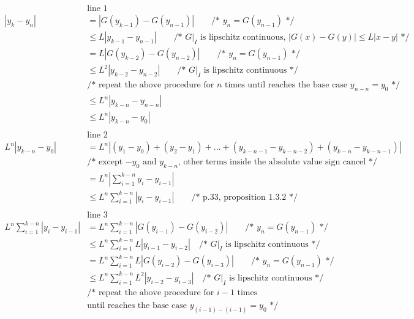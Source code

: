 \documentclass[12pt, border = 4pt, multi]{article} %
\begin{document}
\begin{align*}
&\text{line 1}\\
|y_k - y_n| &= |G(y_{k - 1}) - G(y_{n - 1})| \qquad \text{/* } y_n = G(y_{n - 1}) \text{ */}\\
&\leq L|y_{k - 1} - y_{n - 1}| \qquad \text{/* $G|_I$ is lipschitz continuous, $|G(x) - G(y)| \leq L|x - y|$ */}\\
&= L|G(y_{k - 2}) - G(y_{n - 2})| \qquad \text{/* } y_n = G(y_{n - 1}) \text{ */}\\
&\leq L ^ 2|y_{k - 2} - y_{n - 2}| \qquad \text{/* $G|_I$ is lipschitz continuous */}\\
&\text{/* repeat the above procedure for $n$ times until reaches the base case $y_{n - n} = y_0$ */}\\
&\leq L ^ n|y_{k - n} - y_{n - n}|\\
&\leq L ^ n|y_{k - n} - y_0|\\
\\
&\text{line 2}\\
L ^ n|y_{k - n} - y_0| &= L ^ n|(y_1 - y_0) + (y_2 - y_1) + ... + (y_{k - n - 1} - y_{k - n - 2}) + (y_{k - n} - y_{k - n - 1})|\\
&\text{/* except $-y_0$ and $y_{k - n}$, other terms inside the absolute value sign cancel */}\\
&= L ^ n\left|\sum_{i = 1} ^ {k - n}y_i - y_{i - 1}\right|\\
&\leq L ^ n \sum_{i = 1} ^ {k - n} \left|y_i - y_{i - 1}\right| \qquad \text{/* p.33, proposition 1.3.2 */}\\
\\
&\text{line 3}\\
L ^ n \sum_{i = 1} ^ {k - n} \left|y_i - y_{i - 1}\right| &= L ^ n \sum_{i = 1} ^ {k - n} \left|G(y_{i - 1}) - G(y_{i - 2})\right| \qquad \text{/* } y_n = G(y_{n - 1}) \text{ */}\\
&\leq L ^ n \sum_{i = 1} ^ {k - n} L\left|y_{i - 1} - y_{i - 2}\right| \quad \text{/* $G|_I$ is lipschitz continuous */}\\
&= L ^ n \sum_{i = 1} ^ {k - n} L\left|G(y_{i - 2}) - G(y_{i - 3})\right| \qquad \text{/* } y_n = G(y_{n - 1}) \text{ */}\\
&\leq L ^ n \sum_{i = 1} ^ {k - n} L ^ 2\left|y_{i - 2} - y_{i - 3}\right| \quad \text{/* $G|_I$ is lipschitz continuous */}\\
&\text{/* repeat the above procedure for $i - 1$ times}\\
&\text{until reaches the base case $y_{(i - 1) - (i - 1)} = y_0$ */}\\

\end{align*}
\end{document}

